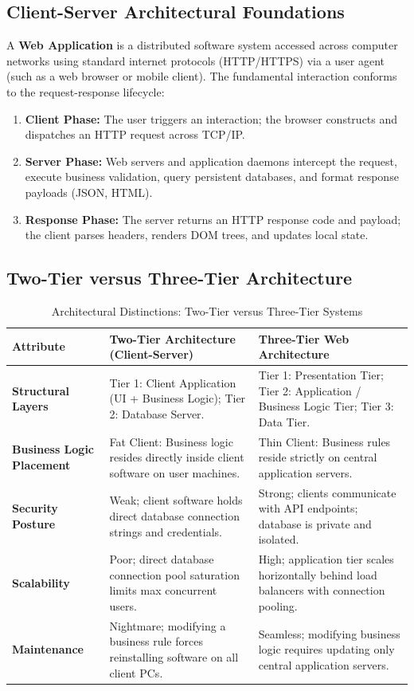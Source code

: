 \subsection{Client-Server Architectural Foundations}
A \textbf{Web Application} is a distributed software system accessed across computer networks using standard internet protocols (HTTP/HTTPS) via a user agent (such as a web browser or mobile client). The fundamental interaction conforms to the request-response lifecycle:
\begin{enumerate}
    \item \textbf{Client Phase:} The user triggers an interaction; the browser constructs and dispatches an HTTP request across TCP/IP.
    \item \textbf{Server Phase:} Web servers and application daemons intercept the request, execute business validation, query persistent databases, and format response payloads (JSON, HTML).
    \item \textbf{Response Phase:} The server returns an HTTP response code and payload; the client parses headers, renders DOM trees, and updates local state.
\end{enumerate}

\subsection{Two-Tier versus Three-Tier Architecture}
\begin{table}[htbp]
\centering
\small
\caption{Architectural Distinctions: Two-Tier versus Three-Tier Systems}
\label{tab:two_tier_vs_three_tier}
\begin{tabularx}{\textwidth}{l p{5cm} X}
\toprule
\textbf{Attribute} & \textbf{Two-Tier Architecture (Client-Server)} & \textbf{Three-Tier Web Architecture} \\
\midrule
\textbf{Structural Layers} & Tier 1: Client Application (UI + Business Logic); Tier 2: Database Server. & Tier 1: Presentation Tier; Tier 2: Application / Business Logic Tier; Tier 3: Data Tier. \\
\textbf{Business Logic Placement} & Fat Client: Business logic resides directly inside client software on user machines. & Thin Client: Business rules reside strictly on central application servers. \\
\textbf{Security Posture} & Weak; client software holds direct database connection strings and credentials. & Strong; clients communicate with API endpoints; database is private and isolated. \\
\textbf{Scalability} & Poor; direct database connection pool saturation limits max concurrent users. & High; application tier scales horizontally behind load balancers with connection pooling. \\
\textbf{Maintenance} & Nightmare; modifying a business rule forces reinstalling software on all client PCs. & Seamless; modifying business logic requires updating only central application servers. \\
\bottomrule
\end{tabularx}
\end{table}

